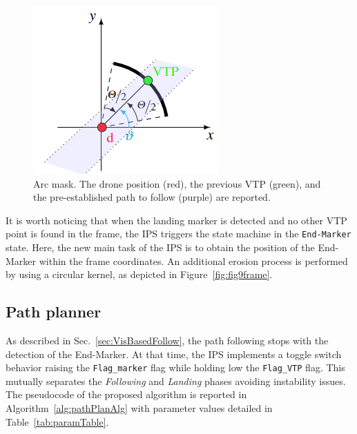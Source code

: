 \documentclass[a4paper,twocolumn,10pt]{article}
\begin{document}
    \begin{figure}
        \centering
        \includegraphics{pics/fig7_no.png}
        \caption{Arc mask. The drone position (red), the previous VTP (green), and the pre-established path to follow (purple) are reported.} 
        \label{fig:fig7arcMask}
    \end{figure}

    It is worth noticing that when the landing marker is detected and no other VTP point is found in the frame, the IPS triggers the state machine in the \texttt{End-Marker} state. Here, the new main task of the IPS is to obtain the position of the End-Marker within the frame coordinates. An additional erosion process is performed by using a circular kernel, as depicted in 
    Figure~\ref{fig:fig9frame}. 

    \subsection{Path planner}
    \label{sec:pathPlan}

    As described in Sec.~\ref{sec:VisBasedFollow}, the path following stops with the detection of the End-Marker. At that time, the IPS implements a toggle switch behavior raising the \texttt{Flag\_marker} flag while holding low the \texttt{Flag\_VTP} flag. This mutually separates the \textit{Following} and \textit{Landing} phases avoiding instability issues. The 
    pseudocode of the proposed algorithm is reported in Algorithm~\ref{alg:pathPlanAlg} with parameter 
    values detailed in Table~\ref{tab:paramTable}.
\end{document}
